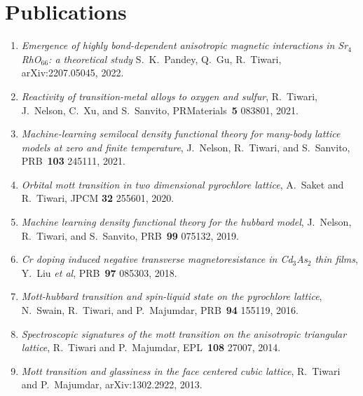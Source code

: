 \documentclass[10pt,a4paper,sans]{moderncv}        %
\begin{document}
\section{Publications}
\begin{enumerate}
  
\item
  \textit{Emergence of highly bond-dependent anisotropic magnetic interactions in Sr$_4$RhO$_66$: a theoretical study}
  S.~K.~Pandey, Q.~Gu, R.~Tiwari, arXiv:2207.05045, 2022.
\item %
  \textit{Reactivity of transition-metal alloys to oxygen and sulfur}, R.~Tiwari, J.~Nelson, C.~Xu, and S.~Sanvito, PRMaterials~\textbf{5} 083801, 2021.

\item %
  \textit{Machine-learning semilocal density functional theory for many-body lattice models at zero and finite temperature},
  J.~Nelson, R.~Tiwari, and S.~Sanvito, PRB~\textbf{103} 245111, 2021.
  
\item %
  \textit{Orbital mott transition in two dimensional pyrochlore lattice}, A.~Saket and R.~Tiwari, JPCM \textbf{32} 255601, 2020.

\item %
  \textit{Machine learning density functional theory for the hubbard model}, J.~Nelson, R.~Tiwari, and S.~Sanvito, PRB~\textbf{99} 075132, 2019.

\item %
  \textit{Cr doping induced negative transverse magnetoresistance in Cd$_3$As$_2$ thin films}, Y.~Liu \textit{et al}, PRB~\textbf{97} 085303, 2018.
  
\item %
  \textit{Mott-hubbard transition and spin-liquid state on the pyrochlore lattice}, N.~Swain, R.~Tiwari, and P.~Majumdar, PRB~\textbf{94} 155119, 2016.
  
\item %
  \textit{Spectroscopic signatures of the mott transition on the anisotropic triangular lattice}, R.~Tiwari and P.~Majumdar, EPL~\textbf{108} 27007, 2014.
  
\item %
  \textit{Mott transition and glassiness in the face centered cubic lattice}, R.~Tiwari and P.~Majumdar, arXiv:1302.2922, 2013.


\end{enumerate}
\end{document}
